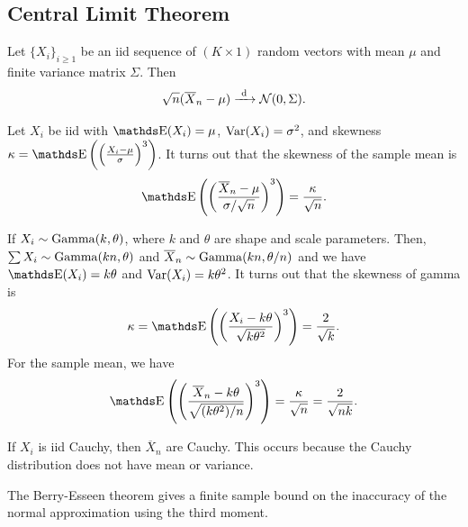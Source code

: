 \documentclass[letterpaper, 10pt]{article}
\begin{document}
\subsection{Central Limit Theorem}
\begin{theorem}
  Let \(\{X_i\}_{i \geq 1}\) be an iid sequence of \((K \times 1)\) random vectors with mean \(\mu\) and finite variance matrix \(\Sigma\).
  Then
  \[
    \sqrt{n} (\overline{X}_n - \mu) \xrightarrow{\ \mathrm{d}\ } \mathcal{N}(0, \Sigma).
  \]
\end{theorem}
\begin{example}
  Let \(X_i\) be iid with \(\E(X_i) = \mu\), \(\operatorname{Var}(X_i) = \sigma^2\), and skewness \(\kappa = \E\left( \left( \frac{X_i - \mu}{\sigma} \right)^3 \right)\).
  It turns out that the skewness of the sample mean is
  \[
    \E\left( \left( \frac{\overline{X}_n - \mu}{\sigma / \sqrt{n}} \right)^3 \right)
    = \frac{\kappa}{\sqrt{n}}.
  \]

  If \(X_i \sim \operatorname{Gamma}(k, \theta)\), where \(k\) and \(\theta\) are shape and scale parameters.
  Then, \(\sum X_i \sim \operatorname{Gamma}(kn, \theta)\) and \(\overline{X}_n \sim \operatorname{Gamma}(kn, \theta / n)\) and we have \(\E(X_i) = k \theta\) and \(\operatorname{Var}(X_i) = k \theta^2\). 
  It turns out that the skewness of gamma is
  \[
    \kappa = \E\left( \left( \frac{X_i - k \theta}{\sqrt{k \theta^2}} \right)^3 \right)
    = \frac{2}{\sqrt{k}}.
  \]
  For the sample mean, we have
  \[
    \E\left( \left( \frac{\overline{X}_n - k \theta}{\sqrt{(k \theta^2) / n}} \right)^3 \right)
    = \frac{\kappa}{\sqrt{n}}
    = \frac{2}{\sqrt{nk}}.
  \]
\end{example}
\begin{example}
  If \(X_i\) is iid Cauchy, then \(\overline{X}_n\) are Cauchy.
  This occurs because the Cauchy distribution does not have mean or variance.
\end{example}
\begin{remark}
  The Berry-Esseen theorem gives a finite sample bound on the inaccuracy of the normal approximation using the third moment.
\end{remark}
\end{document}
